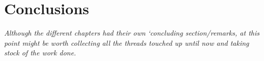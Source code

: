 \chapter*{Conclusions}
{\itshape Although the different chapters had their own `concluding section/remarks, at this point might be worth collecting all the threads touched up until now and taking stock of the work done.}
